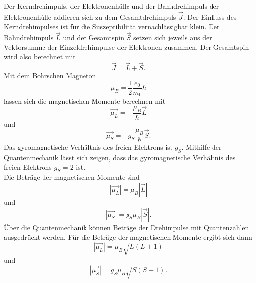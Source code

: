 Der Kerndrehimpuls, der Elektronenhülle und der Bahndrehimpuls der Elektronenhülle addieren sich zu dem Gesamtdrehimpuls $\vec{J}$.
Der Einfluss des Kerndrehimpulses ist für die Suszeptibilität vernachlässigbar klein.
Der Bahndrehimpuls $\vec{L}$ und der Gesamtspin $\vec{S}$ setzen sich jeweils aus der Vektorsumme der Einzeldrehimpulse der Elektronen zusammen.
Der Gesamtspin wird also berechnet mit 
\begin{equation*}
    \vec{J} = \vec{L} + \vec{S}.
\end{equation*}
Mit dem Bohrschen Magneton
\begin{equation*}
    μ_B = \frac{1}{2} \frac{e_0}{m_0} \hbar
\end{equation*}
lassen sich die magnetischen Momente berechnen mit
\begin{equation*}
    \vec{μ_L} = - \frac{μ_B}{\hbar} \vec{L}
\end{equation*}
und
\begin{equation*}
    \vec{μ_S} = - g_S \frac{μ_B}{\hbar} \vec{S}.
\end{equation*}
Das gyromagnetische Verhältnis des freien Elektrons ist $g_S.$
Mithilfe der Quantenmechanik lässt sich zeigen, dass das gyromagnetische Verhältnis des freien Elektrons $g_S = 2$ ist.\\
Die Beträge der magnetischen Momente sind
\begin{equation*}
    |\vec{μ_L}| = μ_B |\vec{L}|
\end{equation*}
und
\begin{equation*}
    |\vec{μ_S}| = g_S μ_B |\vec{S}|.
\end{equation*}
Über die Quantenmechanik können Beträge der Drehimpulse mit Quantenzahlen ausgedrückt werden.
Für die Beträge der magnetischen Momente ergibt sich dann
\begin{equation*}
    |\vec{μ_L}| = μ_B \sqrt{L(L+1)}
\end{equation*}
und
\begin{equation*}
    |\vec{μ_S}| = g_S μ_B \sqrt{S(S+1)}.
\end{equation*}


